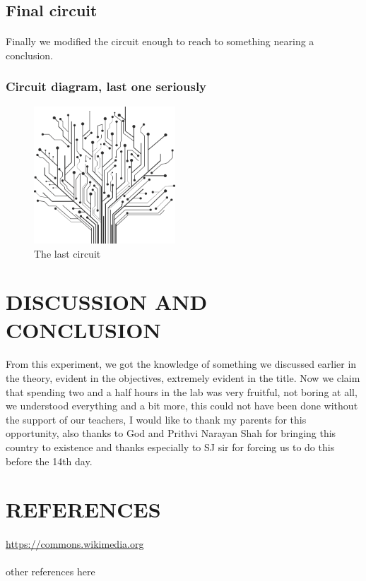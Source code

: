 \documentclass[11pt,a4paper]{article}
\begin{document}
\subsection*{Final circuit}

\paragraph*{}
Finally we modified the circuit enough to reach to something nearing a conclusion.\\

\subsubsection*{Circuit diagram, last one seriously}

\begin{figure}[H]
	\centering
	\includegraphics[width=150pt]{cir3.png}
	\caption{The last circuit}
	\label{fig:circuit3}
\end{figure}

\newpage

\section*{DISCUSSION AND CONCLUSION}

\paragraph{}
From this experiment, we got the knowledge of something we discussed earlier in the theory, evident in the objectives, extremely evident in the title. Now we claim that spending two and a half hours in the lab was very fruitful, not boring at all, we understood everything and a bit more, this could not have been done without the support of our teachers, I would like to thank my parents for this opportunity, also thanks to God and Prithvi Narayan Shah for bringing this country to existence and thanks especially to SJ sir for forcing us to do this before the 14th day.

\section*{REFERENCES}
\paragraph{}
\url{https://commons.wikimedia.org} %
\paragraph{}
other references here
\end{document}
